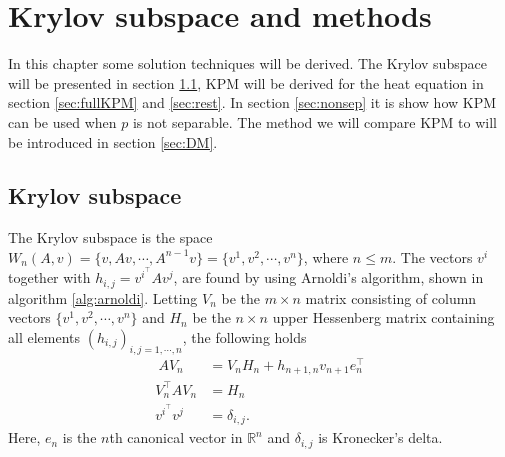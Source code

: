\chapter{Krylov subspace and methods}%
\label{sec:krylov}
In this chapter some solution techniques will be derived.
The Krylov subspace will be presented in section \ref{sec:subspace}, KPM will be derived for the heat equation in section \ref{sec:fullKPM} and \ref{sec:rest}. In section \ref{sec:nonsep} it is show how KPM can be used when $p$ is not separable. The method we will compare KPM to will be introduced in section \ref{sec:DM}. 


\section{Krylov subspace} \label{sec:subspace}
The Krylov subspace is the space $W_n (A,v) = \{v,Av, \cdots, A^{n-1}v\} = \{v^1,v^2,\cdots,v^n\} $, where $n \leq m$. %
The vectors $v^i$ together with $h_{i,j} = v^i^\top Av^j$, are found by using Arnoldi's algorithm, shown in algorithm \ref{alg:arnoldi}. Letting $V_n$ be the $m \times n$ matrix consisting of column vectors $\{v^1,v^2,\cdots,v^n \}$ and $H_n$ be the $n \times n$ upper Hessenberg matrix containing all elements $(h_{i,j})_{i,j=1,\cdots,n}$, the following holds \cite{kryprop}
\begin{align}\
AV_n & = V_n H_n + h_{n+1,n}v_{n+1}e^\top_n \label{eqn:prop1} \\
V^{\top}_n AV_n &= H_n \label{eqn:prop2} \\
v^i^{\top} v^j &= \delta_{i,j}. \label{eqn:prop3}
\end{align}
Here, $e_n$ is the $n$th canonical vector in $\mathbb{R}^n$ and $\delta_{i,j}$ is Kronecker's delta.\\




